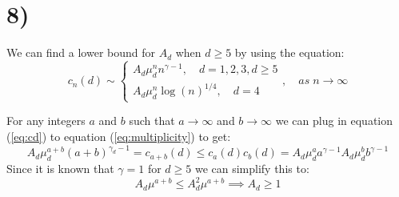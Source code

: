 \documentclass[a4paper]{article}
\begin{document}
\section*{8)}
We can find a lower bound for $A_d$ when $d \geq 5$ by using the equation:
\begin{equation}
    \label{eq:cd}
    c_n(d) \sim 
    \begin{cases}
        A_d\mu_d^nn^{\gamma-1}, \quad d = 1, 2, 3, d \geq 5 \\
        A_d\mu_d^n\log(n)^{1/4}, \quad d = 4
    \end{cases}, \quad as \; n \to \infty
\end{equation}

For any integers $a$ and $b$ such that $a \to \infty$ and $b \to \infty$ we can plug in equation (\ref{eq:cd}) to equation (\ref{eq:multiplicity}) to get:
\begin{equation}
    A_d\mu_d^{a+b}(a+b)^{\gamma_d-1} = c_{a+b}(d)\leq c_a(d)c_b(d) = A_d\mu_d^aa^{\gamma-1}A_d\mu_d^bb^{\gamma-1}
\end{equation}
Since it is known that $\gamma = 1$ for $d \geq 5$ we can simplify this to:
\begin{equation}
    A_d\mu^{a+b} \leq A_d^2\mu^{a+b} \implies A_d \geq 1
\end{equation}
\end{document}
